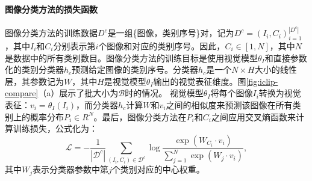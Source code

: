 \paragraph{图像分类方法的损失函数} 图像分类方法的训练数据$D^{c}$是一组\{图像，类别序号\}对，记为$D^{c}={(I_{i}, C_{i})}_{i=1}^{|D^{c}|}$，其中$I_{i}$和$C_{i}$分别表示第$i$个图像和对应的类别序号。因此，$C_{i}\in [1,N]$，其中$N$是数据中的所有类别数目。图像分类方法的训练目标是使用视觉模型$\theta_{I}$和直接参数化的类别分类器$h_{c}$预测给定图像的类别序号。分类器$h_{c}$是一个$N×H$大小的线性层，其参数记为$W$，其中$H$是视觉模型$\theta_{I}$输出的视觉表征维度。图\ref{fig:iclip-compare}（a）展示了批大小为$\mathcal{B}$时的情况。
视觉模型$\theta_{I}$将每个图像$I_{i}$转换为视觉表征：$v_{i}=\theta_{I}(I_{i})$，而分类器$h_{c}$计算$W$和$v_{i}$之间的相似度来预测该图像在所有类别上的概率分布$P_{i}\in R^{N}$。最后，图像分类方法在$P_{i}$和$C_{i}$之间应用交叉熵函数来计算训练损失，公式化为：
\begin{equation}
 \mathcal{L}=-\frac{1}{\left|\mathcal{D}^{c}\right|} \sum_{\left(I_{i}, C_{i}\right) \in \mathcal{D}^{c}} \log \frac{\exp \left(W_{C_{i}} \cdot v_{i}\right)}{\sum_{j=1}^{N} \exp \left(W_{j} \cdot v_{i}\right)},
 \label{eq:iclip-classification}
\end{equation}
其中$W_{j}$表示分类器参数中第$j$个类别对应的中心权重。

